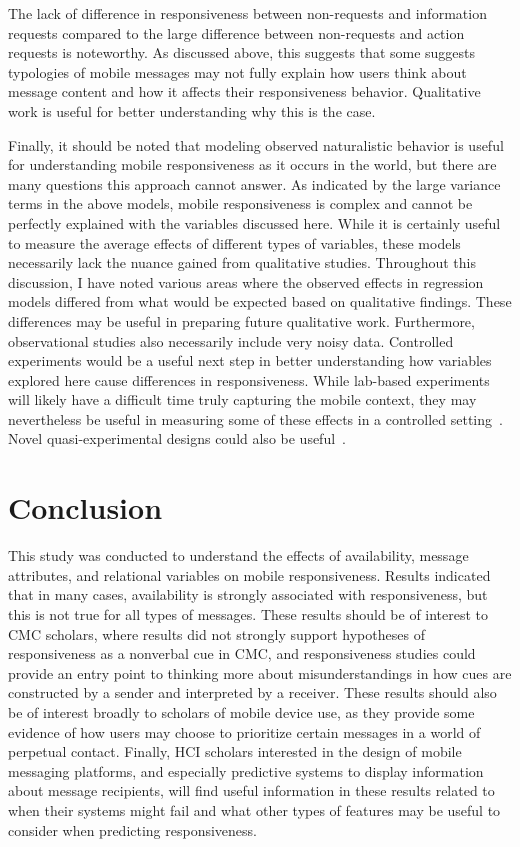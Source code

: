 \documentclass[12pt]{nuthesis}	%
\begin{document}
The lack of difference in responsiveness between non-requests and information requests compared to the large difference between non-requests and action requests is noteworthy. As discussed above, this suggests that some suggests typologies of mobile messages may not fully explain how users think about message content and how it affects their responsiveness behavior. Qualitative work is useful for better understanding why this is the case.

Finally, it should be noted that modeling observed naturalistic behavior is useful for understanding mobile responsiveness as it occurs in the world, but there are many questions this approach cannot answer. As indicated by the large variance terms in the above models, mobile responsiveness is complex and cannot be perfectly explained with the variables discussed here. While it is certainly useful to measure the average effects of different types of variables, these models necessarily lack the nuance gained from qualitative studies. Throughout this discussion, I have noted various areas where the observed effects in regression models differed from what would be expected based on qualitative findings. These differences may be useful in preparing future qualitative work. Furthermore, observational studies also necessarily include very noisy data. Controlled experiments would be a useful next step in better understanding how variables explored here cause differences in responsiveness. While lab-based experiments will likely have a difficult time truly capturing the mobile context, they may nevertheless be useful in measuring some of these effects in a controlled setting~\citep[see e.g.,][]{avrahami2007improving}. Novel quasi-experimental designs could also be useful~\citep[e.g.,][] {tsapeli2015investigating}.

\chapter{Conclusion}

This study was conducted to understand the effects of availability, message attributes, and relational variables on mobile responsiveness. Results indicated that in many cases, availability is strongly associated with responsiveness, but this is not true for all types of messages. These results should be of interest to CMC scholars, where results did not strongly support hypotheses of responsiveness as a nonverbal cue in CMC, and responsiveness studies could provide an entry point to thinking more about misunderstandings in how cues are constructed by a sender and interpreted by a receiver. These results should also be of interest broadly to scholars of mobile device use, as they provide some evidence of how users may choose to prioritize certain messages in a world of perpetual contact. Finally, HCI scholars interested in the design of mobile messaging platforms, and especially predictive systems to display information about message recipients, will find useful information in these results related to when their systems might fail and what other types of features may be useful to consider when predicting responsiveness.
\end{document}
